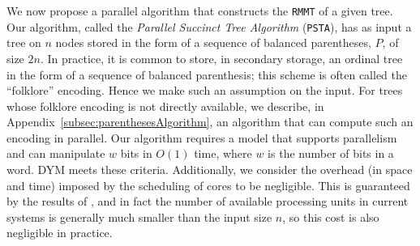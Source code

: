 We now propose a parallel algorithm that constructs the {\tt RMMT} of
a given tree. Our algorithm, called the \emph{Parallel Succinct Tree
  Algorithm} ({\tt PSTA}), has as input a tree on $n$ nodes stored in
the form of a sequence of balanced parentheses, $P$, of size $2n$.  In
practice, it is common to store, in secondary storage, an ordinal tree
in the form of a sequence of balanced parenthesis; this scheme is
often called the ``folklore'' encoding.  Hence we make such an
assumption on the input.  For trees whose folklore encoding is not
directly available, we describe, in
Appendix~\ref{subsec:parenthesesAlgorithm}, an algorithm that can
compute such an encoding in parallel.  Our algorithm requires a model
that supports parallelism and can manipulate $w$ bits in $O(1)$ time,
where $w$ is the number of bits in a word. DYM meets these
criteria. Additionally, we consider the overhead (in space and time)
imposed by the scheduling of cores to be negligible. This is
guaranteed by the results of \cite{Blumofe:1999:SMC:324133.324234},
and in fact the number of available processing units in current
systems is generally much smaller than the input size $n$, so this
cost is also negligible in practice.

